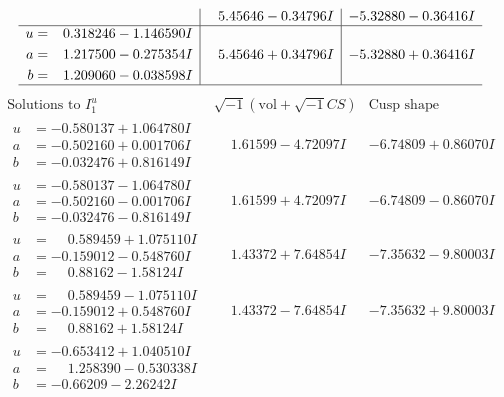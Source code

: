 \documentclass[1p]{elsarticle_modified}
\theoremstyle{definition}
\newcommand{\I}{\sqrt{-1}}
\begin{document}
$$\begin{array}{c|c|c}
 & \phantom{-}5.45646 - 0.34796 I & -5.32880 - 0.36416 I \\ \hline\begin{aligned}
u &= \phantom{-}0.318246 - 1.146590 I \\
a &= \phantom{-}1.217500 - 0.275354 I \\
b &= \phantom{-}1.209060 - 0.038598 I\end{aligned}
 & \phantom{-}5.45646 + 0.34796 I & -5.32880 + 0.36416 I\\
 \hline 
 \end{array}$$\newpage$$\begin{array}{c|c|c}  
\text{Solutions to }I^u_{1}& \I (\text{vol} + \sqrt{-1}CS) & \text{Cusp shape}\\
 \hline 
\begin{aligned}
u &= -0.580137 + 1.064780 I \\
a &= -0.502160 + 0.001706 I \\
b &= -0.032476 + 0.816149 I\end{aligned}
 & \phantom{-}1.61599 - 4.72097 I & -6.74809 + 0.86070 I \\ \hline\begin{aligned}
u &= -0.580137 - 1.064780 I \\
a &= -0.502160 - 0.001706 I \\
b &= -0.032476 - 0.816149 I\end{aligned}
 & \phantom{-}1.61599 + 4.72097 I & -6.74809 - 0.86070 I \\ \hline\begin{aligned}
u &= \phantom{-}0.589459 + 1.075110 I \\
a &= -0.159012 - 0.548760 I \\
b &= \phantom{-}0.88162 - 1.58124 I\end{aligned}
 & \phantom{-}1.43372 + 7.64854 I & -7.35632 - 9.80003 I \\ \hline\begin{aligned}
u &= \phantom{-}0.589459 - 1.075110 I \\
a &= -0.159012 + 0.548760 I \\
b &= \phantom{-}0.88162 + 1.58124 I\end{aligned}
 & \phantom{-}1.43372 - 7.64854 I & -7.35632 + 9.80003 I \\ \hline\begin{aligned}
u &= -0.653412 + 1.040510 I \\
a &= \phantom{-}1.258390 - 0.530338 I \\
b &= -0.66209 - 2.26242 I\end{aligned}

\end{array}$$
\end{document}
